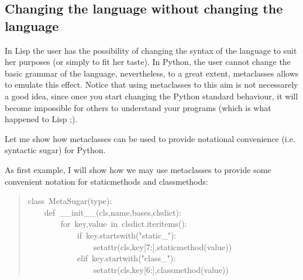 \documentclass[10pt,english]{article}
\begin{document}

\hypertarget{changing-the-language-without-changing-the-language}{}
\subsection*{Changing the language without changing the language}

In Lisp the user has the possibility of changing the syntax of the 
language to suit her purposes (or simply to fit her taste). 
In Python, the user cannot change the basic grammar of the language,
nevertheless, to a great extent, metaclasses allows to emulate this effect. 
Notice that using metaclasses to this aim is not necessarely 
a good idea, since once you start
changing the Python standard behaviour, it will become impossible for
others  to understand your programs (which is what happened to Lisp ;).

Let me show how metaclasses can be used to provide notational convenience 
(i.e. syntactic sugar) for Python.

As first example, I will show how we may use metaclasses to provide some
convenient notation for staticmethods and classmethods:
\begin{quote}
\begin{ttfamily}\begin{flushleft}
\mbox{class~MetaSugar(type):}\\
\mbox{~~~~def~{\_}{\_}init{\_}{\_}(cls,name,bases,clsdict):}\\
\mbox{~~~~~~~~for~key,value~in~clsdict.iteritems():}\\
\mbox{~~~~~~~~~~~~if~key.startswith("static{\_}"):}\\
\mbox{~~~~~~~~~~~~~~~~setattr(cls,key[7:],staticmethod(value))}\\
\mbox{~~~~~~~~~~~~elif~key.startwith("class{\_}"):}\\
\mbox{~~~~~~~~~~~~~~~~setattr(cls,key[6:],classmethod(value))}
\end{flushleft}\end{ttfamily}
\end{quote}
\end{document}
